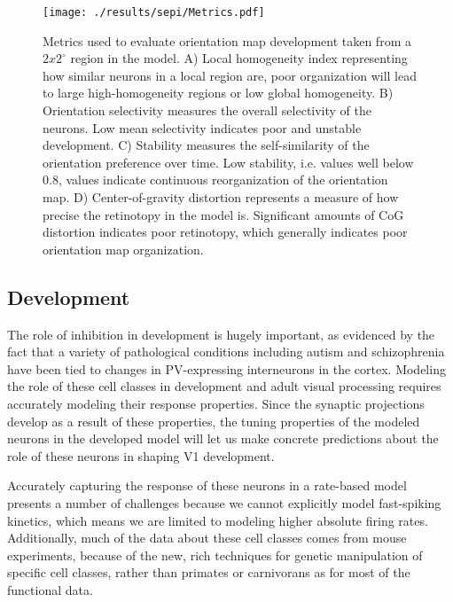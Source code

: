 \begin{figure}
  \texttt{[image: ./results/sepi/Metrics.pdf]}
  \caption[Metrics used to evaluate orientation map
    development.]{Metrics used to evaluate orientation map development
    taken from a $2x2^\circ$ region in the model. A) Local homogeneity
    index representing how similar neurons in a local region are, poor
    organization will lead to large high-homogeneity regions or low
    global homogeneity. B) Orientation selectivity measures the
    overall selectivity of the neurons. Low mean selectivity indicates
    poor and unstable development. C) Stability measures the
    self-similarity of the orientation preference over time. Low
    stability, i.e. values well below 0.8, values indicate continuous
    reorganization of the orientation map. D) Center-of-gravity
    distortion represents a measure of how precise the retinotopy in
    the model is. Significant amounts of CoG distortion indicates poor
    retinotopy, which generally indicates poor orientation map
    organization.}
	\label{MetricPlots}
\end{figure}


\subsection{Development}

The role of inhibition in development is hugely important, as
evidenced by the fact that a variety of pathological conditions
including autism \citep{Wohr2015} and schizophrenia \citep{Lewis2012}
have been tied to changes in PV-expressing interneurons in the
cortex. Modeling the role of these cell classes in development and
adult visual processing requires accurately modeling their response
properties. Since the synaptic projections develop as a result of
these properties, the tuning properties of the modeled neurons in the
developed model will let us make concrete predictions about the role
of these neurons in shaping V1 development.

Accurately capturing the response of these neurons in a rate-based
model presents a number of challenges because we cannot explicitly
model fast-spiking kinetics, which means we are limited to modeling
higher absolute firing rates. Additionally, much of the data about
these cell classes comes from mouse experiments, because of the new,
rich techniques for genetic manipulation of specific cell classes,
rather than primates or carnivorans as for most of the functional
data.

